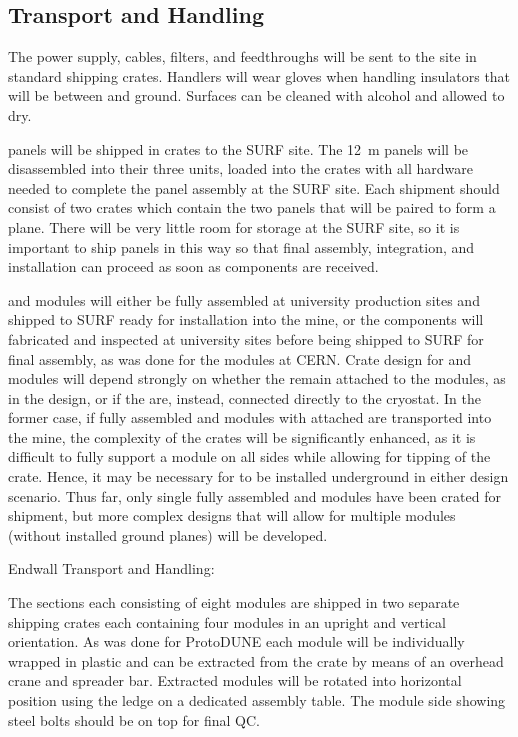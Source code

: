 \subsection{Transport and Handling}
\label{sec:fdsp-hv-install-transport}

The power supply, cables, filters, and feedthroughs will be sent to the site in standard shipping crates.  Handlers will wear gloves when handling insulators that will be between  and ground.  Surfaces can be cleaned with alcohol and allowed to dry.

 panels will be shipped in crates to the SURF site.  The \SI{12}{\m}  panels will be disassembled into their three  units, loaded into the crates with all hardware needed to complete the  panel assembly at the SURF site.  Each shipment should consist of two crates which contain the two  panels that will be paired to form a  plane. There will be very little room for storage at the SURF site, so it is important to ship  panels in this way so that final assembly, integration, and installation can proceed as soon as components are received.

 and  modules will either be fully assembled at university production sites and shipped to SURF ready for installation into the mine, or the components will fabricated and  inspected at university sites before being shipped to SURF for final assembly, as was done for the  modules at CERN. Crate design for  and  modules will depend strongly on whether the  remain attached to the modules, as in the  design, or if the  are, instead, connected directly to the cryostat. In the former case, if fully assembled  and  modules with attached  are transported into the mine, the complexity of the crates will be significantly enhanced, as it is difficult to fully support a module on all sides while allowing for tipping of the crate. Hence, it may be necessary for  to be installed underground in either design scenario. Thus far, only single fully assembled  and  modules have been crated for shipment, but more complex designs that will allow for multiple modules (without installed ground planes) will be developed.

Endwall Transport and Handling:

The  sections each consisting of eight modules are shipped in two separate shipping crates each containing four modules in an upright and vertical orientation.
As was done for ProtoDUNE each  module will be individually wrapped in plastic 
and can be extracted from the crate by means of an overhead crane and spreader bar.
Extracted modules will be rotated into horizontal position using the ledge on a dedicated assembly table. The module side showing steel bolts should be on top for final QC. 


